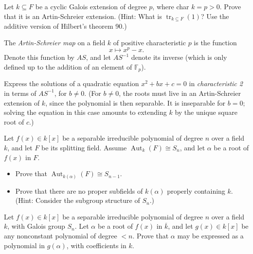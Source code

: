 \documentclass[openany]{book}
\begin{document}
\begin{prob}
Let \( k \subseteq F \) be a cyclic Galois extension of degree \( p \), where char \( k = p > 0 \).  
Prove that it is an Artin-Schreier extension. (Hint: What is \( \operatorname{tr}_{k \subseteq F}(1) \)? Use the additive version of Hilbert's theorem 90.)
\end{prob}

\begin{prob}
The \emph{Artin-Schreier map} on a field \( k \) of positive characteristic \( p \) is the function  
\[x \mapsto x^p - x.\]  
Denote this function by \( \mathit{AS} \), and let \( \mathit{AS}^{-1} \) denote its inverse (which is only defined up to the addition of an element of \( \mathbb{F}_p \)).

Express the solutions of a quadratic equation \( x^2 + bx + c = 0 \) in \emph{characteristic 2} in terms of \( \mathit{AS}^{-1} \), for \( b \neq 0 \). (For \( b \neq 0 \), the roots must live in an Artin-Schreier extension of \( k \), since the polynomial is then separable. It is inseparable for \( b = 0 \); solving the equation in this case amounts to extending \( k \) by the unique square root of \( c \).)
\end{prob}

\begin{prob}
Let \( f(x) \in k[x] \) be a separable irreducible polynomial of degree \( n \) over a field \( k \), and let \( F \) be its splitting field. Assume \( \operatorname{Aut}_{k}(F) \cong S_n \), and let \( \alpha \) be a root of \( f(x) \) in \( F \).  

\begin{itemize}
    \item Prove that \( \operatorname{Aut}_{k(\alpha)}(F) \cong S_{n-1} \).  
    \item Prove that there are no proper subfields of \( k(\alpha) \) properly containing \( k \). (Hint: Consider the subgroup structure of \( S_n \).)
\end{itemize}
\end{prob}

\begin{prob}
Let \( f(x) \in k[x] \) be a separable irreducible polynomial of degree \( n \) over a field \( k \), with Galois group \( S_n \). Let \( \alpha \) be a root of \( f(x) \) in \( \overline{k} \), and let \( g(x) \in k[x] \) be any nonconstant polynomial of degree \( < n \). Prove that \( \alpha \) may be expressed as a polynomial in \( g(\alpha) \), with coefficients in \( k \).
\end{prob}
\end{document}
